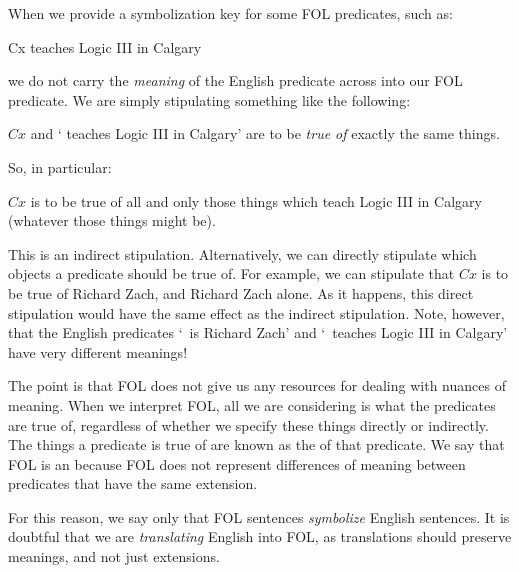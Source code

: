 When we provide a symbolization key for some FOL predicates, such as:
	\begin{ekey}
		\item[Cx]  teaches Logic III in Calgary
	\end{ekey}
we do not carry the \emph{meaning} of the English predicate across into our FOL predicate. We are simply stipulating something like the following:
	\begin{ebullet}
		\item $Cx$ and ` teaches Logic III in Calgary' are to be \emph{true of} exactly the same things.
	\end{ebullet}
So, in particular:
	\begin{ebullet}
		\item $Cx$ is to be true of all and only those things which teach Logic III in Calgary (whatever those things might be).
	\end{ebullet}
This is an indirect stipulation. Alternatively, we can directly stipulate which objects a predicate should be true of. For example, we can stipulate that $Cx$ is to be true of Richard Zach, and Richard Zach alone. As it happens, this direct stipulation would have the same effect as the indirect stipulation. Note, however, that the English predicates `\blank\ is Richard Zach' and `\blank\ teaches Logic III in Calgary' have very different meanings!

The point is that FOL does not give us any resources for dealing with nuances of meaning. When we interpret FOL, all we are considering is what the predicates are true of, regardless of whether we specify these things directly or indirectly. The things a predicate is true of are known as the  of that predicate. We say that FOL is an  because FOL does not represent differences of meaning between predicates that have the same extension.

For this reason, we say only that FOL sentences \emph{symbolize} English sentences. It is doubtful that we are \emph{translating} English into FOL, as translations should preserve meanings, and not just extensions.

